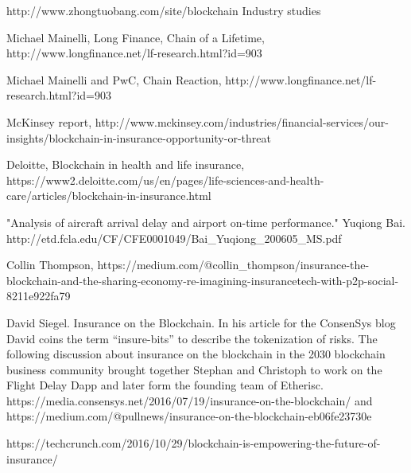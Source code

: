 \documentclass[12pt]{article}
\begin{document}
http://www.zhongtuobang.com/site/blockchain
Industry studies


Michael Mainelli, Long Finance, Chain of a Lifetime, http://www.longfinance.net/lf-research.html?id=903


Michael Mainelli and PwC, Chain Reaction, http://www.longfinance.net/lf-research.html?id=903


McKinsey report, http://www.mckinsey.com/industries/financial-services/our-insights/blockchain-in-insurance-opportunity-or-threat


Deloitte, Blockchain in health and life insurance, https://www2.deloitte.com/us/en/pages/life-sciences-and-health-care/articles/blockchain-in-insurance.html


"Analysis of aircraft arrival delay and airport on-time performance." Yuqiong Bai.
http://etd.fcla.edu/CF/CFE0001049/Bai_Yuqiong_200605_MS.pdf

Collin Thompson, https://medium.com/@collin_thompson/insurance-the-blockchain-and-the-sharing-economy-re-imagining-insurancetech-with-p2p-social-8211e922fa79


David Siegel. Insurance on the Blockchain. In his article for the ConsenSys blog David coins the term “insure-bits” to describe the tokenization of risks. The following discussion about insurance on the blockchain in the 2030 blockchain business community brought together Stephan and Christoph to work on the Flight Delay Dapp and later form the founding team of Etherisc.
https://media.consensys.net/2016/07/19/insurance-on-the-blockchain/ and
https://medium.com/@pullnews/insurance-on-the-blockchain-eb06fe23730e


https://techcrunch.com/2016/10/29/blockchain-is-empowering-the-future-of-insurance/ 
\end{document}
